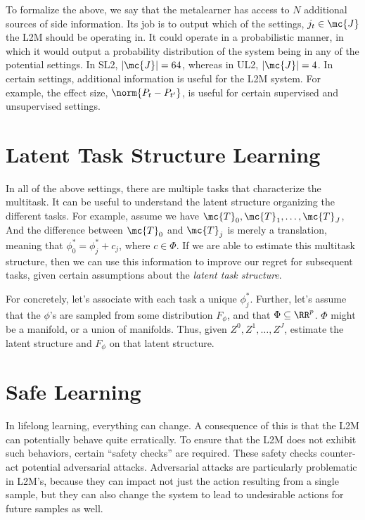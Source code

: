 \documentclass{article}
\begin{document}
To formalize the above, we say that the metalearner has access to $N$ additional sources of side information.  Its job is to output which of the settings, $j_t \in \mc{J}$ the L2M should be operating in. It could operate in a probabilistic manner, in which it would output a probability distribution of the system being in any of the potential settings.  In SL2, $|\mc{J}|=64$, whereas in UL2, $|\mc{J}|=4$.  In certain settings, additional information is useful for the L2M system. For example, the effect size,  $\norm{P_t - P_{t'}}$, is useful for certain supervised and unsupervised settings. 



\section{Latent Task Structure Learning}
\label{sec:struct}


In all of the above settings, there are multiple tasks that characterize the multitask.  It can be useful to understand the latent structure organizing the different tasks.  For example, assume we have $\mc{T}_0, \mc{T}_1, \ldots, \mc{T}_J$, And the difference between $\mc{T}_0$ and $\mc{T}_j$ is merely a translation, meaning that $\phi_0^* = \phi_j^* + c_j$, where $c \in \Phi$. If we are able to estimate this multitask structure, then we can use this information to improve our regret for subsequent tasks, given certain assumptions about the \emph{latent task structure}.  

For concretely, let's associate with each task a unique $\phi^*_j$.  Further, let's assume that the $\phi$'s are sampled from some distribution $F_\phi$, and that $\Phi \subseteq \RR^p$.  $\Phi$ might be a manifold, or a union of manifolds. Thus, given $Z^0, Z^1, \ldots, Z^J$, estimate the latent structure and $F_\phi$ on that latent structure.   



\section{Safe Learning}
\label{sec:safe}



In lifelong learning, everything can change.  A consequence of this is that the L2M can potentially behave quite erratically.  To ensure that the L2M does not exhibit such behaviors, certain ``safety checks'' are required.  These safety checks counter-act potential adversarial attacks. Adversarial attacks are particularly problematic in L2M's, because they can impact not just the action resulting from a single sample, but they can also change the system to lead to undesirable actions for future samples as well.    
\end{document}
